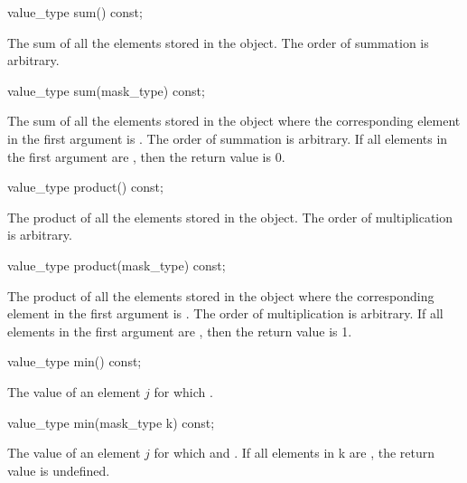 \begin{itemdecl}
value_type sum() const;
\end{itemdecl}
\begin{itemdescr}
  \pnum\returns The sum of all the elements stored in the \datapar object.
    The order of summation is arbitrary.
\end{itemdescr}

\begin{itemdecl}
value_type sum(mask_type) const;
\end{itemdecl}
\begin{itemdescr}
  \pnum\returns The sum of all the elements stored in the \datapar object where the corresponding element in the first argument is \true.
  The order of summation is arbitrary.
  If all elements in the first argument are \false, then the return value is 0.
\end{itemdescr}

\begin{itemdecl}
value_type product() const;
\end{itemdecl}
\begin{itemdescr}
  \pnum\returns The product of all the elements stored in the \datapar object.
    The order of multiplication is arbitrary.
\end{itemdescr}

\begin{itemdecl}
value_type product(mask_type) const;
\end{itemdecl}
\begin{itemdescr}
  \pnum\returns The product of all the elements stored in the \datapar object where the corresponding element in the first argument is \true.
  The order of multiplication is arbitrary.
  If all elements in the first argument are \false, then the return value is 1.
\end{itemdescr}

\begin{itemdecl}
value_type min() const;
\end{itemdecl}
\begin{itemdescr}
  \pnum\returns The value of an element $j$ for which  \foralli.
\end{itemdescr}

\begin{itemdecl}
value_type min(mask_type k) const;
\end{itemdecl}
\begin{itemdescr}
  \pnum\returns The value of an element $j$ for which  and  \foralli.
  \pnum\remarks If all elements in \code k are \false, the return value is undefined.%
\end{itemdescr}

